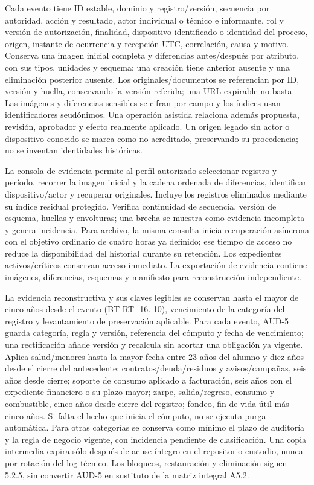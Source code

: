 Cada evento tiene ID estable, dominio y registro/versión, secuencia por autoridad, acción y resultado, actor individual o técnico e informante, rol y versión de autorización, finalidad, dispositivo identificado o identidad del proceso, origen, instante de ocurrencia y recepción UTC, correlación, causa y motivo. Conserva una imagen inicial completa y diferencias antes/después por atributo, con sus tipos, unidades y esquema; una creación tiene anterior ausente y una eliminación posterior ausente. Los originales/documentos se referencian por ID, versión y huella, conservando la versión referida; una URL expirable no basta. Las imágenes y diferencias sensibles se cifran por campo y los índices usan identificadores seudónimos. Una operación asistida relaciona además propuesta, revisión, aprobador y efecto realmente aplicado. Un origen legado sin actor o dispositivo conocido se marca como no acreditado, preservando su procedencia; no se inventan identidades históricas.

La consola de evidencia permite al perfil autorizado seleccionar registro y período, recorrer la imagen inicial y la cadena ordenada de diferencias, identificar dispositivo/actor y recuperar originales. Incluye los registros eliminados mediante su índice residual protegido. Verifica continuidad de secuencia, versión de esquema, huellas y envolturas; una brecha se muestra como evidencia incompleta y genera incidencia. Para archivo, la misma consulta inicia recuperación asíncrona con el objetivo ordinario de cuatro horas ya definido; ese tiempo de acceso no reduce la disponibilidad del historial durante su retención. Los expedientes activos/críticos conservan acceso inmediato. La exportación de evidencia contiene imágenes, diferencias, esquemas y manifiesto para reconstrucción independiente.

La evidencia reconstructiva y sus claves legibles se conservan hasta el mayor de cinco años desde el evento (BT RT -16. 10), vencimiento de la categoría del registro y levantamiento de preservación aplicable. Para cada evento, AUD-5 guarda categoría, regla y versión, referencia del cómputo y fecha de vencimiento; una rectificación añade versión y recalcula sin acortar una obligación ya vigente. Aplica salud/menores hasta la mayor fecha entre 23 años del alumno y diez años desde el cierre del antecedente; contratos/deuda/residuos y avisos/campañas, seis años desde cierre; soporte de consumo aplicado a facturación, seis años con el expediente financiero o su plazo mayor; zarpe, salida/regreso, consumo y combustible, cinco años desde cierre del registro; fondeo, fin de vida útil más cinco años. Si falta el hecho que inicia el cómputo, no se ejecuta purga automática. Para otras categorías se conserva como mínimo el plazo de auditoría y la regla de negocio vigente, con incidencia pendiente de clasificación. Una copia intermedia expira sólo después de acuse íntegro en el repositorio custodio, nunca por rotación del log técnico. Los bloqueos, restauración y eliminación siguen 5.2.5, sin convertir AUD-5 en sustituto de la matriz integral A5.2.

